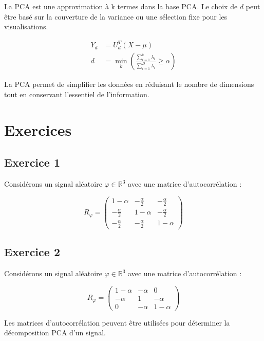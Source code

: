 \documentclass[12pt]{article}
\begin{document}
La PCA est une approximation à k termes dans la base PCA. Le choix de $d$ peut être basé sur la couverture de la variance ou une sélection fixe pour les visualisations.

\begin{align}
Y_d &= U_d^T (X - \mu) \\
d &= \min_k \left( \frac{\sum_{i=1}^{k} \lambda_i}{\sum_{i=1}^{D} \lambda_i} \geq \alpha \right)
\end{align}

\begin{tcolorbox}[title={Vulgarisation simple}]
La PCA permet de simplifier les données en réduisant le nombre de dimensions tout en conservant l'essentiel de l'information.
\end{tcolorbox}

\section{Exercices}

\subsection{Exercice 1}

Considérons un signal aléatoire $\varphi \in \mathbb{R}^3$ avec une matrice d'autocorrélation :

\begin{equation}
R_\varphi = \begin{pmatrix}
1 - \alpha & -\frac{\alpha}{2} & -\frac{\alpha}{2} \\
-\frac{\alpha}{2} & 1 - \alpha & -\frac{\alpha}{2} \\
-\frac{\alpha}{2} & -\frac{\alpha}{2} & 1 - \alpha
\end{pmatrix}
\end{equation}

\subsection{Exercice 2}

Considérons un signal aléatoire $\varphi \in \mathbb{R}^3$ avec une matrice d'autocorrélation :

\begin{equation}
R_\varphi = \begin{pmatrix}
1 - \alpha & -\alpha & 0 \\
-\alpha & 1 & -\alpha \\
0 & -\alpha & 1 - \alpha
\end{pmatrix}
\end{equation}

\begin{tcolorbox}[title={À retenir}]
Les matrices d'autocorrélation peuvent être utilisées pour déterminer la décomposition PCA d'un signal.
\end{tcolorbox}
\end{document}
